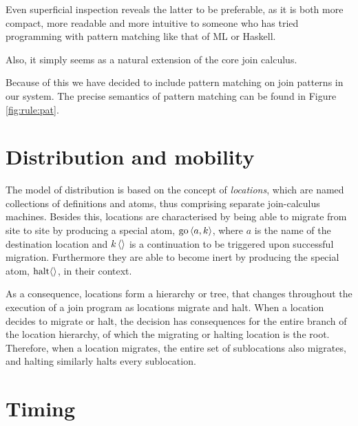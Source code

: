 Even superficial inspection reveals the latter to be preferable, as it is both
more compact, more readable and more intuitive to someone who has tried
programming with pattern matching like that of ML or Haskell.

Also, it simply seems as a natural extension of the core join calculus.

Because of this we have decided to include pattern matching on join patterns in our system.
The precise semantics of pattern matching can be found in Figure \ref{fig:rule:pat}.

\section{Distribution and mobility}
The model of distribution is based on the concept of \emph{locations}, which
are named collections of definitions and atoms, thus comprising separate
join-calculus machines. Besides this, locations are characterised by being able
to migrate from site to site by producing a special atom, $\Go<a,k>$, where $a$
is the name of the destination location and $\atm k <>$ is a continuation to be
triggered upon successful migration. Furthermore they are able to become inert
by producing the special atom, $\Halt<>$, in their context.

As a consequence, locations form a hierarchy or tree, that changes throughout
the execution of a join program as locations migrate and halt.
When a location decides to migrate or halt, the decision has consequences for
the entire branch of the location hierarchy, of which the migrating or halting
location is the root. Therefore, when a location migrates, the entire set of
sublocations also migrates, and halting similarly halts every sublocation.


\section{Timing}

